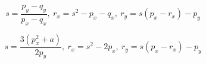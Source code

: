 \documentclass{article}
\begin{document}
\[
s = \frac{p_y-q_y}{p_x-q_x},\ 
r_x = s^2-p_x-q_x,\ 
r_y = s(p_x-r_x)-p_y
\]

\[
s = \frac{3(p_x^2+a)}{2p_y},\ 
r_x = s^2-2p_x,\ 
r_y = s(p_x-r_x)-p_y
\]
\end{document}
